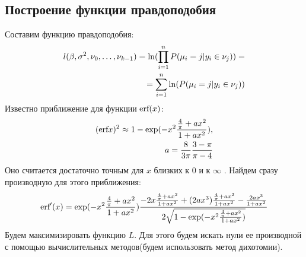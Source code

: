 \documentclass[12pt]{article}
\begin{document}
\subsection{Построение функции правдоподобия}
Составим функцию правдоподобия:
\begin{eqnarray}
    l(\beta,\sigma^2, \nu_0,\dots, \nu_{k-1})=\textup{ln}(\prod_{i=1}^{n}P(\mu_i=j|y_i\in \nu_j))=\\
    =\sum_{i=1}^{n}\ln(P(\mu_i=j|y_i\in \nu_j))
\end{eqnarray}
Известно приближение для функции $\textup{erf}(x)$:
\begin{eqnarray}
    (\textup{erf} x)^2\approx 1- \exp(-x^2 \frac{\frac{4}{\pi}+ax^2}{1+ax^2}),\\
    a=\frac{8}{3\pi}\frac{3-\pi}{\pi -4}
\end{eqnarray}
Оно считается достаточно точным для $x$ близких к $0$ и к $\infty$ \cite{Winitzki}. \hfill\break
Найдем сразу производную для этого приближения:
\begin{eqnarray}
    \textup{erf}'(x) = \exp(-x^2 \frac{\frac{4}{\pi}+ax^2}{1+ax^2}) \frac{-2x\frac{\frac{4}{\pi}+ax^2}{1+ax^2}+(2ax^3)\frac{\frac{4}{\pi}+ax^2}{1+ax^2}-\frac{2ax^3}{1+ax^2}}{2\sqrt{1- \exp(-x^2 \frac{\frac{4}{\pi}+ax^2}{1+ax^2})}}
\end{eqnarray}
Будем максимизировать функцию $L$.
Для этого будем искать нули ее производной с помощью вычислительных методов(будем использовать метод дихотомии).
\end{document}

